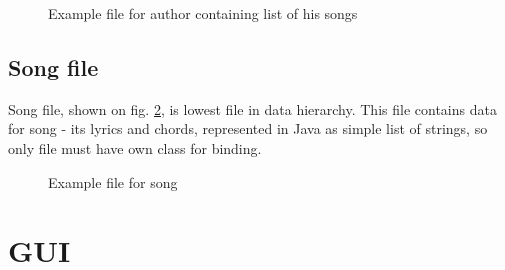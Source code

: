 \documentclass[titlepage]{article}
\begin{document}
\begin{figure}

\caption{Example file for author containing list of his songs}
\label{lst:artist}
\end{figure}

\subsection{Song file}
Song file, shown on fig. \ref{lst:song}, is lowest file in data hierarchy. This
file contains data for song - its lyrics and chords, represented in Java as
simple list of strings, so only file must have own class for binding.

\begin{figure}

\caption{Example file for song}
\label{lst:song}
\end{figure}

\section{GUI}
\end{document}
